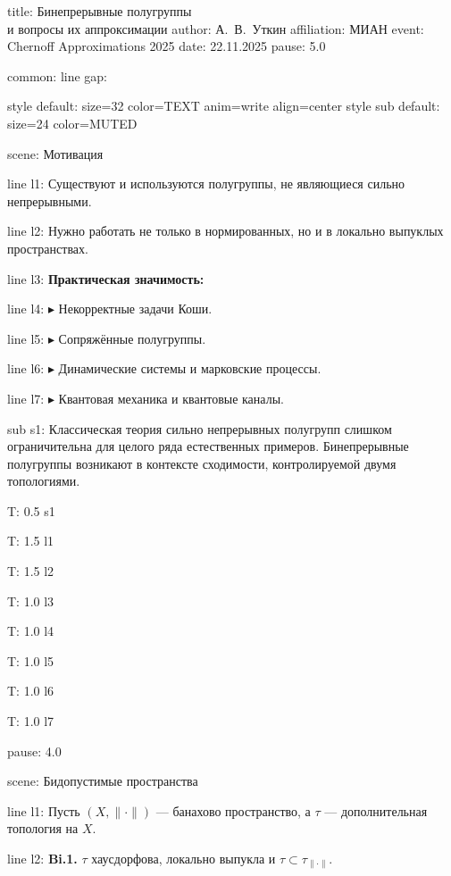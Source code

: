 \documentclass[a4paper,11pt]{article}
\begin{document}
title: {Бинепрерывные полугруппы\\ и вопросы их аппроксимации}
author: {А.~В.~Уткин}
affiliation: {МИАН}
event: {Chernoff Approximations 2025}
date: {22.11.2025}
pause: 5.0


common:
line gap: {\vspace{0.8cm}}

style default: size=32 color=TEXT anim=write align=center
style sub default: size=24 color=MUTED



scene: {Мотивация}

line l1: {Существуют и используются полугруппы, не являющиеся сильно непрерывными.}

line l2: {Нужно работать не только в нормированных, но и в локально выпуклых пространствах.}

line l3: {\textbf{Практическая значимость:}}

line l4: {{\color{yellow}$\blacktriangleright$ Некорректные задачи Коши.}}

line l5: {{\color{yellow}$\blacktriangleright$ Сопряжённые полугруппы.}}

line l6: {{\color{yellow}$\blacktriangleright$ Динамические системы и марковские процессы.}}

line l7: {{\color{yellow}$\blacktriangleright$ Квантовая механика и квантовые каналы.}}


sub s1: {Классическая теория сильно непрерывных полугрупп слишком ограничительна для целого ряда естественных примеров. Бинепрерывные полугруппы возникают в контексте сходимости, контролируемой двумя топологиями.}


T: 0.5 s1

T: 1.5 l1

T: 1.5 l2

T: 1.0 l3

T: 1.0 l4

T: 1.0 l5

T: 1.0 l6

T: 1.0 l7

pause: 4.0



scene: {Бидопустимые пространства}

line l1: {Пусть $(X,\|\cdot\|)$ --- банахово пространство, а $\tau$ --- дополнительная топология на $X$.}

line l2: {\textbf{Bi.1.} $\tau$ хаусдорфова, локально выпукла и $\tau\subset\tau_{\|\cdot\|}$.}
\end{document}
